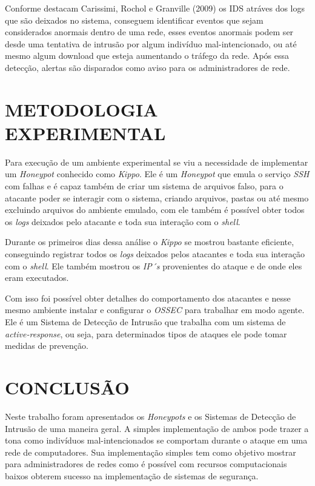 \documentclass[article,12pt,oneside,a4paper,english,brazil]{unifil}
\begin{document}
\begin{Spacing}{1.5}
Conforme destacam Carissimi, Rochol e Granville (2009) os IDS atráves dos
logs que são deixados no sistema, conseguem identificar eventos que sejam considerados anormais dentro de uma rede, esses eventos anormais podem ser desde uma tentativa de intrusão por algum indivíduo mal-intencionado, ou até mesmo algum download que esteja aumentando o tráfego da rede. Após essa detecção, alertas são disparados como aviso para os administradores de rede.

\section*{METODOLOGIA EXPERIMENTAL}

Para execução de um ambiente experimental se viu a necessidade de implementar um \textit{Honeypot} conhecido como \textit{Kippo}. Ele é um \textit{Honeypot} que emula o serviço \textit{SSH} com falhas e é capaz também de criar um sistema de arquivos falso, para o atacante poder se interagir com o sistema, criando arquivos, pastas ou até mesmo excluindo arquivos do ambiente emulado, com ele também é possível obter todos os \textit{logs} deixados pelo atacante e toda sua interação com o \textit{shell}. 

Durante os primeiros dias dessa análise o \textit{Kippo} se mostrou bastante eficiente, conseguindo registrar todos os \textit{logs} deixados pelos atacantes e toda sua interação com o \textit{shell}. Ele também mostrou os \textit{IP´s} provenientes do ataque e de onde eles eram executados.

Com isso foi possível obter detalhes do comportamento dos atacantes e nesse mesmo ambiente instalar e configurar o \textit{OSSEC} para trabalhar em modo agente. Ele é um Sistema de Detecção de Intrusão que trabalha com um sistema de \textit{active-response}, ou seja, para determinados tipos de ataques ele pode tomar medidas de prevenção.

\section*{CONCLUSÃO}
Neste trabalho foram apresentados os \textit{Honeypots} e os Sistemas de Detecção de Intrusão de uma maneira geral. A simples implementação de ambos pode trazer a tona como indivíduos mal-intencionados se comportam durante o ataque em uma rede de computadores. Sua implementação simples tem como objetivo mostrar para administradores de redes como é possível com recursos computacionais baixos obterem sucesso na implementação de sistemas de segurança. 

\end{Spacing}
\postextual
\end{document}
